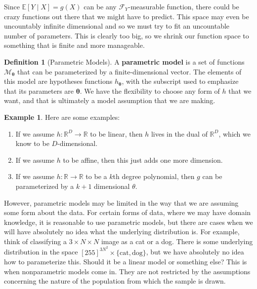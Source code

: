 \documentclass{article}
\theoremstyle{definition}
\newtheorem{example}{Example}[section]
\newtheorem{definition}{Definition}[section]
\begin{document}
    Since $\mathbb{E}[Y \mid X] = g(X)$ can be any $\mathcal{F}_Y$-measurable function, there could be crazy functions out there that we might have to predict. This space may even be uncountably infinite dimensional and so we must try to fit an uncountable number of parameters. This is clearly too big, so we shrink our function space to something that is finite and more manageable. 

    \begin{definition}[Parametric Models]
      A \textbf{parametric model} is a set of functions $\mathcal{M}_{\boldsymbol{\theta}}$ that can be parameterized by a finite-dimensional vector. The elements of this model are hypotheses functions $h_{\boldsymbol{\theta}}$, with the subscript used to emphasize that its parameters are $\boldsymbol{\theta}$. We have the flexibility to choose any form of $h$ that we want, and that is ultimately a model assumption that we are making. 
    \end{definition}

    \begin{example}
      Here are some examples: 
      \begin{enumerate}
        \item If we assume $h: \mathbb{R}^D \rightarrow \mathbb{R}$ to be linear, then $h$ lives in the dual of $\mathbb{R}^D$, which we know to be $D$-dimensional. 
        \item If we assume $h$ to be affine, then this just adds one more dimension. 
        \item If we assume $h: \mathbb{R} \rightarrow \mathbb{R}$ to be a $k$th degree polynomial, then $g$ can be parameterized by a $k+1$ dimensional $\theta$. 
      \end{enumerate}
    \end{example}

    However, parametric models may be limited in the way that we are assuming some form about the data. For certain forms of data, where we may have domain knowledge, it is reasonable to use parametric models, but there are cases when we will have absolutely no idea what the underlying distribution is. For example, think of classifying a $3 \times N \times N$ image as a cat or a dog. There is some underlying distribution in the space $[255]^{3 N^2} \times \{\text{cat}, \text{dog}\}$, but we have absolutely no idea how to parameterize this. Should it be a linear model or something else? This is when nonparametric models come in. They are not restricted by the assumptions concerning the nature of the population from which the sample is drawn. 
\end{document}
